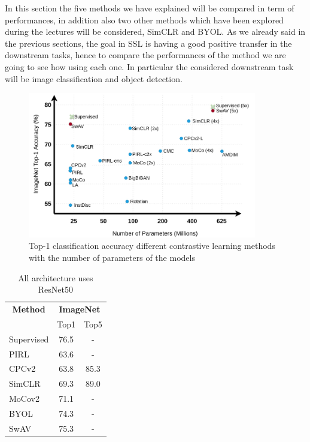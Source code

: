 In this section the five methods we have explained will be compared in term of performances, in addition also two other methods which have been explored during the lectures will be considered, SimCLR and BYOL. As we already said in the previous sections, the goal in SSL is having a good positive transfer in the downstream tasks, hence to compare the performances of the method we are going to see how using each one. In particular the considered downstream task will be image classification and object detection.
\begin{figure}[H]
	\centering
	\includegraphics[width=10cm]{./images/imagenet-top1-acc-comp.png}
	\caption{Top-1 classification accuracy different contrastive learning methods with the number of parameters of the models}
	\label{fig:imagenet-top1-acc-comp}
\end{figure}


\begin{table}[H]
	\centering
	\begin{tabular}{|lcc|}
		\hline
		\multicolumn{1}{|c}{\textbf{Method}} & \multicolumn{2}{c|}{\textbf{ImageNet}} \\
		\multicolumn{1}{|c}{} & Top1 & Top5 \\
		\hline
		Supervised & 76.5 & - \\
		\hline
		PIRL & 63.6 & - \\
		CPCv2 & 63.8 & 85.3 \\
		SimCLR & 69.3 & 89.0 \\
		MoCov2 & 71.1 & - \\
		BYOL & 74.3 & - \\
		SwAV & 75.3 & -\\
		\hline
	\end{tabular}
	\caption{All architecture uses ResNet50}
\end{table}